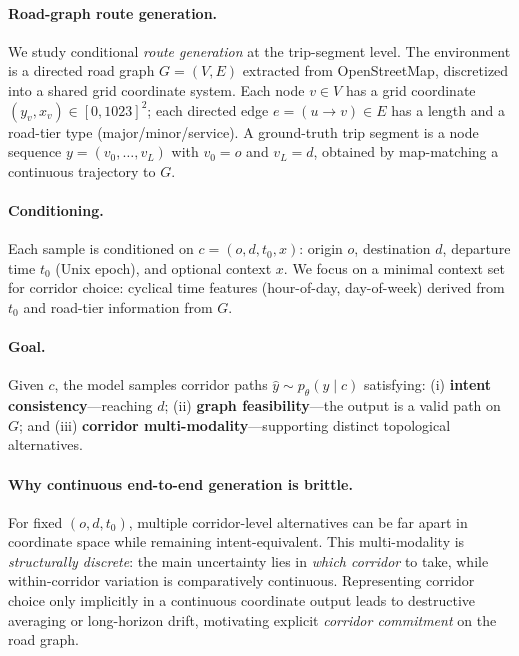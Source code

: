 
\paragraph{Road-graph route generation.}
We study conditional \emph{route generation} at the trip-segment level.
The environment is a directed road graph $G=(V,E)$ extracted from OpenStreetMap, discretized into a shared grid coordinate system.
Each node $v\in V$ has a grid coordinate $(y_v,x_v)\in[0,1023]^2$; each directed edge $e=(u\!\rightarrow\!v)\in E$ has a length and a road-tier type (major/minor/service).
A ground-truth trip segment is a node sequence $y=(v_0,\dots,v_L)$ with $v_0=o$ and $v_L=d$, obtained by map-matching a continuous trajectory to $G$.

\paragraph{Conditioning.}
Each sample is conditioned on $c=(o,d,t_0,x)$: origin $o$, destination $d$, departure time $t_0$ (Unix epoch), and optional context $x$.
We focus on a minimal context set for corridor choice: cyclical time features (hour-of-day, day-of-week) derived from $t_0$ and road-tier information from $G$.

\paragraph{Goal.}
Given $c$, the model samples corridor paths $\hat{y}\sim p_\theta(y\mid c)$ satisfying:
(i) \textbf{intent consistency}---reaching $d$;
(ii) \textbf{graph feasibility}---the output is a valid path on $G$; and
(iii) \textbf{corridor multi-modality}---supporting distinct topological alternatives.

\paragraph{Why continuous end-to-end generation is brittle.}
For fixed $(o,d,t_0)$, multiple corridor-level alternatives can be far apart in coordinate space while remaining intent-equivalent.
This multi-modality is \emph{structurally discrete}: the main uncertainty lies in \emph{which corridor} to take, while within-corridor variation is comparatively continuous.
Representing corridor choice only implicitly in a continuous coordinate output leads to destructive averaging or long-horizon drift, motivating explicit \emph{corridor commitment} on the road graph.

